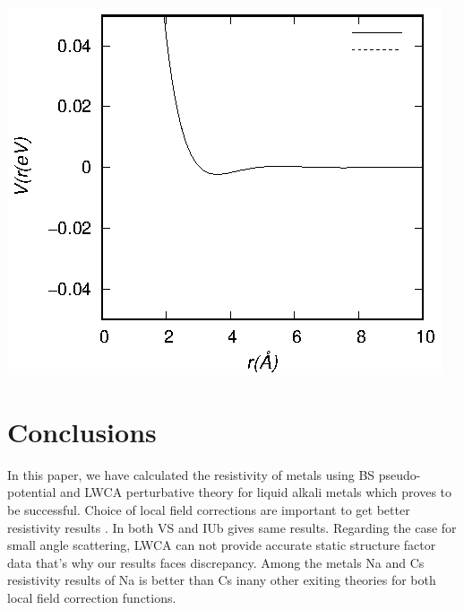 \documentclass[final,12pt]{elsarticle}
\begin{document}
{\begin{adjustbox}{center,caption={q Vs SS(q) graph for comparison of IU and VS method for Na},label={somelabel},nofloat=figure,vspace=\bigskipamount}
	\includegraphics[width=\textwidth]{NacomBRET.eps}
\end{adjustbox}
\section{Conclusions}
\label{conclu}
In this paper, we have calculated the resistivity of metals using BS pseudo-potential and LWCA perturbative theory for liquid alkali metals which proves to be successful. Choice of local field corrections are important to get better resistivity results . In both VS and IUb gives same results. Regarding the case for small angle scattering, LWCA can not provide accurate static structure factor data that's why our results faces discrepancy. Among the metals Na and Cs resistivity results of Na is better than Cs inany other exiting theories for both local field correction functions. 
\newpage
\newpage

\begin{thebibliography}{thesis}
	

\end{thebibliography}}
\end{document}

